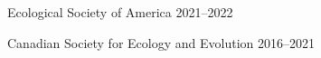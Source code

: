 

\begin{cventries}

  \cventry
    {} %
    {Ecological Society of America} %
    {2021--2022} %
    {} %
    {
    }

  \cventry
    {} %
    {Canadian Society for Ecology and Evolution} %
    {2016--2021} %
    {} %
    {
    }

\end{cventries}
